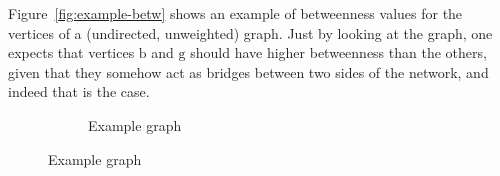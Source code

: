 \ifproof
Figure~\ref{fig:example-betw} shows an example of betweenness values for the
vertices of a (undirected, unweighted) graph. Just by looking at the graph, one
expects that vertices $\mathrm{b}$ and $\mathrm{g}$ should have higher
betweenness than the others, given that they somehow act as bridges between two
sides of the network, and indeed that is the case.
\begin{figure}[ht]
  \centering
  \begin{subfigure}[c]{0.2\textwidth}
    \centering
    \caption{Example graph}
  \end{subfigure}
  \hfill

\end{figure}
